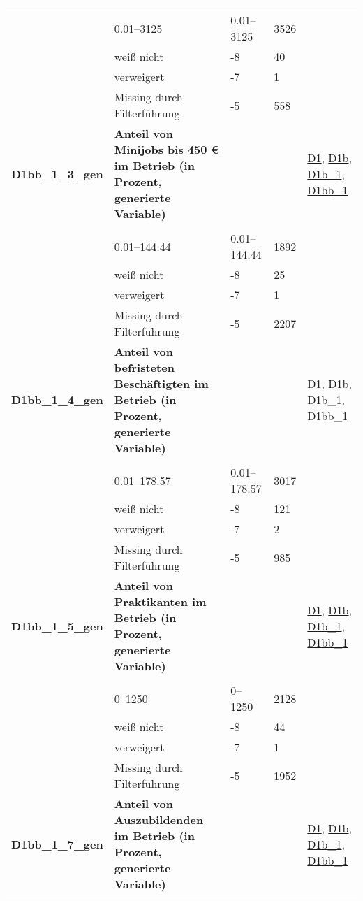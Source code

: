 \begin{longtable}{| L{2.5cm} | L{8.25cm}| C{1.5cm} | R{1.25cm} | C{2.25cm} |  }
   &  &  &  &  \\ 
   & 0.01--3125 & 0.01--3125 & 3526 &  \\ 
   & weiß nicht & -8 & 40 &  \\ 
   & verweigert & -7 & 1 &  \\ 
   & Missing durch Filterführung & -5 & 558 &  \\ 
   \midrule
\textbf{D1bb\_1\_3\_gen}\label{var:suf:D1bb:1:3:gen} & \textbf{Anteil von Minijobs bis 450 € im Betrieb (in Prozent, generierte Variable)} &  &  & \hyperref[D1]{D1}, \hyperref[D1b]{D1b}, \hyperref[D1b:1]{D1b\_1}, \hyperref[D1bb:1]{D1bb\_1} \\ 
   &  &  &  &  \\ 
   & 0.01--144.44 & 0.01--144.44 & 1892 &  \\ 
   & weiß nicht & -8 & 25 &  \\ 
   & verweigert & -7 & 1 &  \\ 
   & Missing durch Filterführung & -5 & 2207 &  \\ 
   \midrule
\textbf{D1bb\_1\_4\_gen}\label{var:suf:D1bb:1:4:gen} & \textbf{Anteil von befristeten Beschäftigten im Betrieb (in Prozent, generierte Variable)} &  &  & \hyperref[D1]{D1}, \hyperref[D1b]{D1b}, \hyperref[D1b:1]{D1b\_1}, \hyperref[D1bb:1]{D1bb\_1} \\ 
   &  &  &  &  \\ 
   & 0.01--178.57 & 0.01--178.57 & 3017 &  \\ 
   & weiß nicht & -8 & 121 &  \\ 
   & verweigert & -7 & 2 &  \\ 
   & Missing durch Filterführung & -5 & 985 &  \\ 
   \midrule
\textbf{D1bb\_1\_5\_gen}\label{var:suf:D1bb:1:5:gen} & \textbf{Anteil von Praktikanten im Betrieb (in Prozent, generierte Variable)} &  &  & \hyperref[D1]{D1}, \hyperref[D1b]{D1b}, \hyperref[D1b:1]{D1b\_1}, \hyperref[D1bb:1]{D1bb\_1} \\ 
   &  &  &  &  \\ 
   & 0--1250 & 0--1250 & 2128 &  \\ 
   & weiß nicht & -8 & 44 &  \\ 
   & verweigert & -7 & 1 &  \\ 
   & Missing durch Filterführung & -5 & 1952 &  \\ 
   \midrule
\textbf{D1bb\_1\_7\_gen}\label{var:suf:D1bb:1:7:gen} & \textbf{Anteil von Auszubildenden im Betrieb (in Prozent, generierte Variable)} &  &  & \hyperref[D1]{D1}, \hyperref[D1b]{D1b}, \hyperref[D1b:1]{D1b\_1}, \hyperref[D1bb:1]{D1bb\_1} \\ 

\end{longtable}
